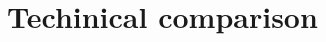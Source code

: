 \documentclass[a4paper]{article}
\begin{document}
	\newpage
	\section{Techinical comparison}
	
\end{document}
